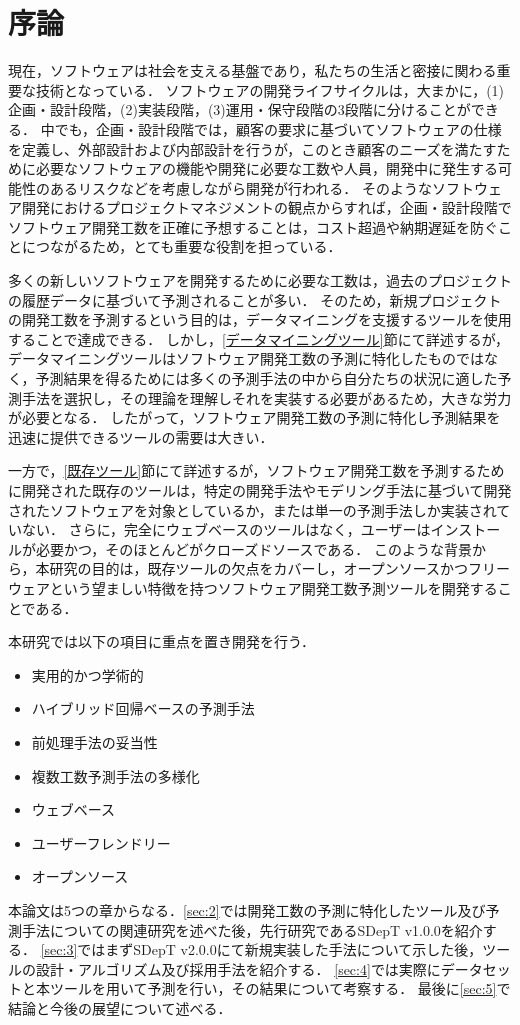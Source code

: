 \section{序論}\label{sec:1}

現在，ソフトウェアは社会を支える基盤であり，私たちの生活と密接に関わる重要な技術となっている．
ソフトウェアの開発ライフサイクルは，大まかに，(1)企画・設計段階，(2)実装段階，(3)運用・保守段階の3段階に分けることができる．
中でも，企画・設計段階では，顧客の要求に基づいてソフトウェアの仕様を定義し、外部設計および内部設計を行うが，このとき顧客のニーズを満たすために必要なソフトウェアの機能や開発に必要な工数や人員，開発中に発生する可能性のあるリスクなどを考慮しながら開発が行われる．
そのようなソフトウェア開発におけるプロジェクトマネジメントの観点からすれば，企画・設計段階でソフトウェア開発工数を正確に予想することは，コスト超過や納期遅延を防ぐことにつながるため，とても重要な役割を担っている．

多くの新しいソフトウェアを開発するために必要な工数は，過去のプロジェクトの履歴データに基づいて予測されることが多い．
そのため，新規プロジェクトの開発工数を予測するという目的は，データマイニングを支援するツールを使用することで達成できる．
しかし，\ref{データマイニングツール}節にて詳述するが，データマイニングツールはソフトウェア開発工数の予測に特化したものではなく，予測結果を得るためには多くの予測手法の中から自分たちの状況に適した予測手法を選択し，その理論を理解しそれを実装する必要があるため，大きな労力が必要となる．
したがって，ソフトウェア開発工数の予測に特化し予測結果を迅速に提供できるツールの需要は大きい．

一方で，\ref{既存ツール}節にて詳述するが，ソフトウェア開発工数を予測するために開発された既存のツールは，特定の開発手法やモデリング手法に基づいて開発されたソフトウェアを対象としているか，または単一の予測手法しか実装されていない．
さらに，完全にウェブベースのツールはなく，ユーザーはインストールが必要かつ，そのほとんどがクローズドソースである．
このような背景から，本研究の目的は，既存ツールの欠点をカバーし，オープンソースかつフリーウェアという望ましい特徴を持つソフトウェア開発工数予測ツールを開発することである．

本研究では以下の項目に重点を置き開発を行う．
\begin{itemize}
  \item 実用的かつ学術的
  \item ハイブリッド回帰ベースの予測手法
  \item 前処理手法の妥当性
  \item 複数工数予測手法の多様化
  \item ウェブベース
  \item ユーザーフレンドリー
  \item オープンソース
\end{itemize}

本論文は5つの章からなる．\ref{sec:2}では開発工数の予測に特化したツール及び予測手法についての関連研究を述べた後，先行研究であるSDepT v1.0.0を紹介する．
\ref{sec:3}ではまずSDepT v2.0.0にて新規実装した手法について示した後，ツールの設計・アルゴリズム及び採用手法を紹介する．
\ref{sec:4}では実際にデータセットと本ツールを用いて予測を行い，その結果について考察する．
最後に\ref{sec:5}で結論と今後の展望について述べる．
